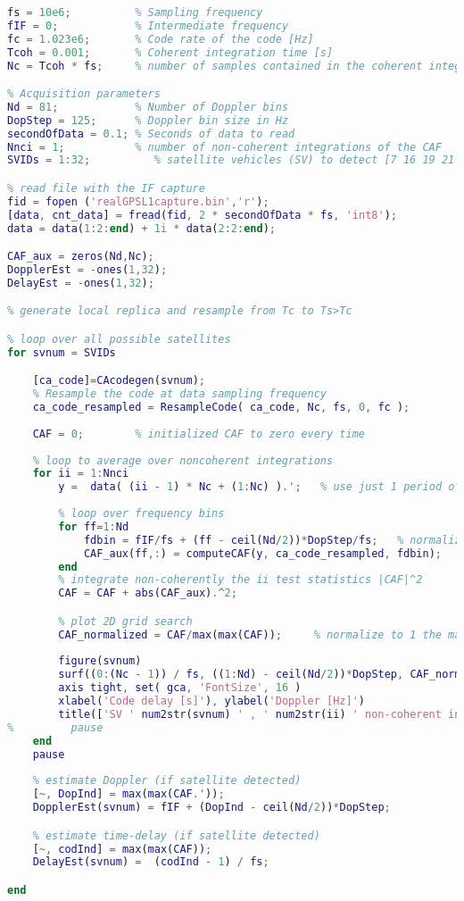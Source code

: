\documentclass[11pt]{article}
\begin{document}
\begin{lstlisting}[language=Matlab,basicstyle=\scriptsize,keywordstyle=\color{blue}, commentstyle=\color{green},frame=single]
% signal parameters
fs = 10e6;          % Sampling frequency
fIF = 0;            % Intermediate frequency
fc = 1.023e6;       % Code rate of the code [Hz]
Tcoh = 0.001;       % Coherent integration time [s]
Nc = Tcoh * fs;     % number of samples contained in the coherent integration time

% Acquisition parameters
Nd = 81;            % Number of Doppler bins
DopStep = 125;      % Doppler bin size in Hz
secondOfData = 0.1; % Seconds of data to read
Nnci = 1;           % number of non-coherent integrations of the CAF
SVIDs = 1:32;          % satellite vehicles (SV) to detect [7 16 19 21 22 25]

% read file with the IF capture
fid = fopen ('realGPSL1capture.bin','r');
[data, cnt_data] = fread(fid, 2 * secondOfData * fs, 'int8');
data = data(1:2:end) + 1i * data(2:2:end);

CAF_aux = zeros(Nd,Nc);
DopplerEst = -ones(1,32);
DelayEst = -ones(1,32);

% generate local replica and resample from Tc to Ts>Tc

% loop over all possible satellites
for svnum = SVIDs

    [ca_code]=CAcodegen(svnum);
    % Resample the code at data sampling frequency
    ca_code_resampled = ResampleCode( ca_code, Nc, fs, 0, fc );   
    
    CAF = 0;        % initialized CAF to zero every time
    
    % loop to average over noncoherent integrations
    for ii = 1:Nnci
        y =  data( (ii - 1) * Nc + (1:Nc) ).';   % use just 1 period of code at the time
        
        % loop over frequency bins
        for ff=1:Nd
            fdbin = fIF/fs + (ff - ceil(Nd/2))*DopStep/fs;   % normalized Doppler bin
            CAF_aux(ff,:) = computeCAF(y, ca_code_resampled, fdbin);
        end
        % integrate non-coherently the ii test statistics |CAF|^2 
        CAF = CAF + abs(CAF_aux).^2;

        % plot 2D grid search
        CAF_normalized = CAF/max(max(CAF));     % normalize to 1 the maximum value
        
        figure(svnum)
        surf((0:(Nc - 1)) / fs, ((1:Nd) - ceil(Nd/2))*DopStep, CAF_normalized, 'EdgeColor', 'none');
        axis tight, set( gca, 'FontSize', 16 )
        xlabel('Code delay [s]'), ylabel('Doppler [Hz]')
        title(['SV ' num2str(svnum) ' , ' num2str(ii) ' non-coherent integrations'])
%         pause
    end
    pause
    
    % estimate Doppler (if satellite detected)
    [~, DopInd] = max(max(CAF.'));
    DopplerEst(svnum) = fIF + (DopInd - ceil(Nd/2))*DopStep;

    % estimate time-delay (if satellite detected)
    [~, codInd] = max(max(CAF));
    DelayEst(svnum) =  (codInd - 1) / fs;

end
\end{lstlisting}
\end{document}
